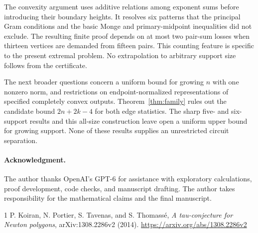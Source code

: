 \documentclass[11pt]{article}
\theoremstyle{remark}\newtheorem{remark}[theorem]{Remark}
\begin{document}
The convexity argument uses additive relations among exponent
sums before introducing their boundary heights. It resolves six
patterns that the principal Gram conditions and the basic Monge and
primary-midpoint inequalities did not exclude. The resulting finite
proof depends on at most two pair-sum losses when thirteen vertices
are demanded from fifteen pairs. This counting feature is specific
to the present extremal problem. No extrapolation to arbitrary support
size follows from the certificate.

The next broader questions concern a uniform bound for growing $n$
with one nonzero norm, and restrictions on endpoint-normalized
representations of specified completely convex outputs. Theorem~\ref{thm:family} rules out the candidate bound $2n+2k-4$
for both edge statistics. The sharp five- and six-support results
and this all-size construction leave open a uniform upper bound
for growing support. None of these results supplies an unrestricted
circuit separation.

\paragraph{Acknowledgment.}
The author thanks OpenAI\textquoteright{}s GPT-6 for assistance with
exploratory calculations, proof development, code checks, and manuscript
drafting. The author takes responsibility for the mathematical claims
and the final manuscript.

\begin{thebibliography}{1}
P. Koiran, N. Portier, S. Tavenas, and S. Thomass\'e,
\emph{A tau-conjecture for Newton polygons}, arXiv:1308.2286v2 (2014).
\url{https://arxiv.org/abs/1308.2286v2}

\end{thebibliography}
\end{document}
